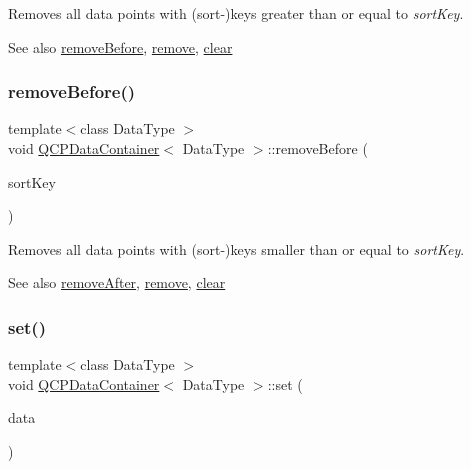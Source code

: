 Removes all data points with (sort-\/)keys greater than or equal to {\itshape sort\+Key}.

\begin{DoxySeeAlso}{See also}
\hyperlink{classQCPDataContainer_aa7f74cbce304b0369e1626c3798e1eda}{remove\+Before}, \hyperlink{classQCPDataContainer_ae5f569a120648b167efa78835f12fd38}{remove}, \hyperlink{classQCPDataContainer_a7e2b29736c6fd761649bda1a54ba967f}{clear} 
\end{DoxySeeAlso}
\mbox{\label{classQCPDataContainer_aa7f74cbce304b0369e1626c3798e1eda}} 
\subsubsection{\texorpdfstring{remove\+Before()}{removeBefore()}}
{\footnotesize\ttfamily template$<$class Data\+Type $>$ \\
void \hyperlink{classQCPDataContainer}{Q\+C\+P\+Data\+Container}$<$ Data\+Type $>$\+::remove\+Before (\begin{DoxyParamCaption}\item[{double}]{sort\+Key }\end{DoxyParamCaption})}

Removes all data points with (sort-\/)keys smaller than or equal to {\itshape sort\+Key}.

\begin{DoxySeeAlso}{See also}
\hyperlink{classQCPDataContainer_abbe5d87ffc10b5aeffa5bb42cf03aa3c}{remove\+After}, \hyperlink{classQCPDataContainer_ae5f569a120648b167efa78835f12fd38}{remove}, \hyperlink{classQCPDataContainer_a7e2b29736c6fd761649bda1a54ba967f}{clear} 
\end{DoxySeeAlso}
\mbox{\label{classQCPDataContainer_ae7042bd534fc3ce7befa2ce3f790b5bf}} 
\subsubsection{\texorpdfstring{set()}{set()}\hspace{0.1cm}{\footnotesize\ttfamily [1/2]}}
{\footnotesize\ttfamily template$<$class Data\+Type $>$ \\
void \hyperlink{classQCPDataContainer}{Q\+C\+P\+Data\+Container}$<$ Data\+Type $>$\+::set (\begin{DoxyParamCaption}\item[{const \hyperlink{classQCPDataContainer}{Q\+C\+P\+Data\+Container}$<$ Data\+Type $>$ \&}]{data }\end{DoxyParamCaption})}

